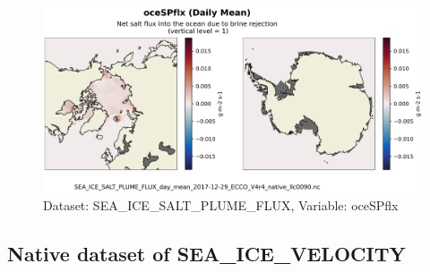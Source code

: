 \begin{figure}[H]
\centering
\includegraphics[scale=0.55]{../images/plots/v4r4/native_plots/Sea-Ice_Salt_Plume_Fluxes/oceSPflx.png}
\caption{Dataset: SEA\_ICE\_SALT\_PLUME\_FLUX, Variable: oceSPflx}
\label{tab:table-SEA_ICE_SALT_PLUME_FLUX_oceSPflx-Plot}
\end{figure}
\newpage
\subsection{Native dataset of SEA\_ICE\_VELOCITY}
\newp
